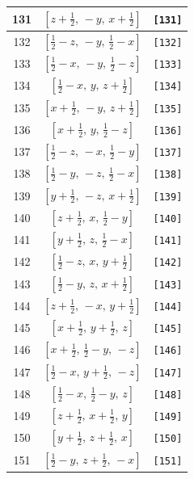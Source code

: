 \documentclass[fleqn,8pt]{jsarticle}
\begin{document}
\begin{longtable}{ccc}
131 & $\left[ z + \frac{1}{2},\, - y,\, x + \frac{1}{2} \right]$ & {\tt [131]} \\ \hline
132 & $\left[ \frac{1}{2} - z,\, - y,\, \frac{1}{2} - x \right]$ & {\tt [132]} \\ \hline
133 & $\left[ \frac{1}{2} - x,\, - y,\, \frac{1}{2} - z \right]$ & {\tt [133]} \\ \hline
134 & $\left[ \frac{1}{2} - x,\, y,\, z + \frac{1}{2} \right]$ & {\tt [134]} \\ \hline
135 & $\left[ x + \frac{1}{2},\, - y,\, z + \frac{1}{2} \right]$ & {\tt [135]} \\ \hline
136 & $\left[ x + \frac{1}{2},\, y,\, \frac{1}{2} - z \right]$ & {\tt [136]} \\ \hline
137 & $\left[ \frac{1}{2} - z,\, - x,\, \frac{1}{2} - y \right]$ & {\tt [137]} \\ \hline
138 & $\left[ \frac{1}{2} - y,\, - z,\, \frac{1}{2} - x \right]$ & {\tt [138]} \\ \hline
139 & $\left[ y + \frac{1}{2},\, - z,\, x + \frac{1}{2} \right]$ & {\tt [139]} \\ \hline
140 & $\left[ z + \frac{1}{2},\, x,\, \frac{1}{2} - y \right]$ & {\tt [140]} \\ \hline
141 & $\left[ y + \frac{1}{2},\, z,\, \frac{1}{2} - x \right]$ & {\tt [141]} \\ \hline
142 & $\left[ \frac{1}{2} - z,\, x,\, y + \frac{1}{2} \right]$ & {\tt [142]} \\ \hline
143 & $\left[ \frac{1}{2} - y,\, z,\, x + \frac{1}{2} \right]$ & {\tt [143]} \\ \hline
144 & $\left[ z + \frac{1}{2},\, - x,\, y + \frac{1}{2} \right]$ & {\tt [144]} \\ \hline
145 & $\left[ x + \frac{1}{2},\, y + \frac{1}{2},\, z \right]$ & {\tt [145]} \\ \hline
146 & $\left[ x + \frac{1}{2},\, \frac{1}{2} - y,\, - z \right]$ & {\tt [146]} \\ \hline
147 & $\left[ \frac{1}{2} - x,\, y + \frac{1}{2},\, - z \right]$ & {\tt [147]} \\ \hline
148 & $\left[ \frac{1}{2} - x,\, \frac{1}{2} - y,\, z \right]$ & {\tt [148]} \\ \hline
149 & $\left[ z + \frac{1}{2},\, x + \frac{1}{2},\, y \right]$ & {\tt [149]} \\ \hline
150 & $\left[ y + \frac{1}{2},\, z + \frac{1}{2},\, x \right]$ & {\tt [150]} \\ \hline
151 & $\left[ \frac{1}{2} - y,\, z + \frac{1}{2},\, - x \right]$ & {\tt [151]} \\ \hline

\end{longtable}
\end{document}
